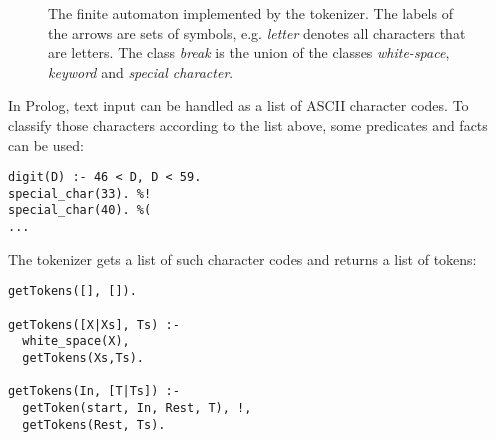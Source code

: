 \begin{figure}[htb]
\centering
{}
\caption{The finite automaton implemented by the tokenizer. The labels of the arrows are sets of symbols, e.g. \emph{letter} denotes all characters that are letters. The class \emph{break} is the union of the classes  \emph{white-space}, \emph{keyword} and \emph{special character}.}
\label{fig:tokenizer_automaton}
\end{figure}


In Prolog, text input can be handled as a list of ASCII character codes. To classify those characters according to the list above, some predicates and facts can be used:

\begin{lstlisting}
digit(D) :- 46 < D, D < 59.
special_char(33). %!
special_char(40). %(
...
\end{lstlisting}

The tokenizer gets a list of such character codes and returns a list of tokens:

\begin{lstlisting}
getTokens([], []).

getTokens([X|Xs], Ts) :- 
  white_space(X),
  getTokens(Xs,Ts). 
  
getTokens(In, [T|Ts]) :- 
  getToken(start, In, Rest, T), !, 
  getTokens(Rest, Ts).
\end{lstlisting}

